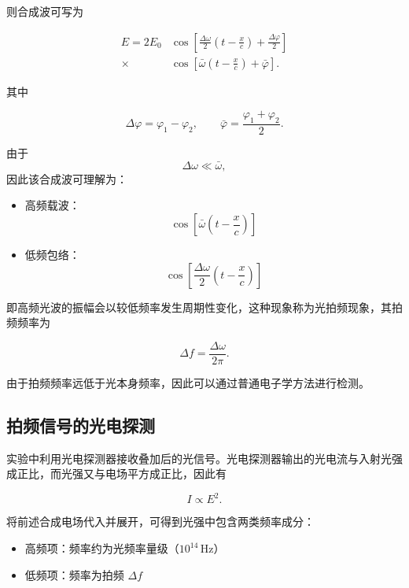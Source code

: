 \documentclass[a4paper]{ctexart}
\begin{document}
则合成波可写为

\begin{align}
E
=
2E_0
&\cos\left[
\frac{\Delta\omega}{2}
\left(t-\frac{x}{c}\right)
+\frac{\Delta\varphi}{2}
\right]
\nonumber\\
\times\,
&\cos\left[
\bar{\omega}
\left(t-\frac{x}{c}\right)
+\bar{\varphi}
\right].
\end{align}

其中

\[
\Delta\varphi=\varphi_1-\varphi_2,
\qquad
\bar{\varphi}=\frac{\varphi_1+\varphi_2}{2}.
\]

由于
\[
\Delta\omega \ll \bar{\omega},
\]
因此该合成波可理解为：

\begin{itemize}
    \item 高频载波：
    \[
    \cos\left[\bar{\omega}\left(t-\frac{x}{c}\right)\right]
    \]
    
    \item 低频包络：
    \[
    \cos\left[\frac{\Delta\omega}{2}\left(t-\frac{x}{c}\right)\right]
    \]
\end{itemize}

即高频光波的振幅会以较低频率发生周期性变化，这种现象称为光拍频现象，其拍频频率为

\begin{equation}
    \Delta f = \frac{\Delta\omega}{2\pi}.
\end{equation}

由于拍频频率远低于光本身频率，因此可以通过普通电子学方法进行检测。


\subsection{拍频信号的光电探测}

实验中利用光电探测器接收叠加后的光信号。光电探测器输出的光电流与入射光强成正比，而光强又与电场平方成正比，因此有

\begin{equation}
    I \propto E^2.
\end{equation}

将前述合成电场代入并展开，可得到光强中包含两类频率成分：

\begin{itemize}
    \item 高频项：频率约为光频率量级（$10^{14}\,\mathrm{Hz}$）
    \item 低频项：频率为拍频 $\Delta f$
\end{itemize}
\end{document}
